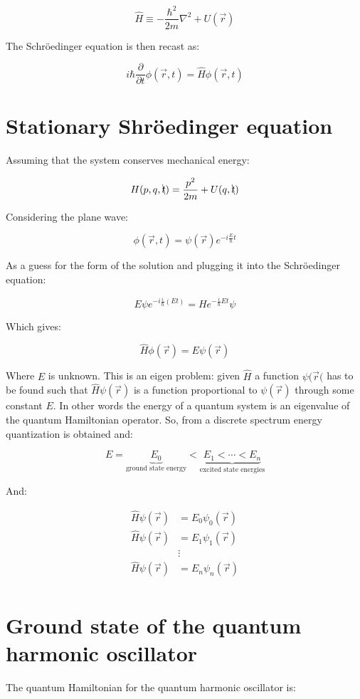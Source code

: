     $$\hat{H} \equiv -\frac{\hbar^2}{2m}\nabla^2+U(\vec{r})$$

    The Schr\"oedinger equation is then recast as:

    $$i\hbar \frac{\partial {}}{\partial {t}}\phi(\vec{r},t) = \hat{H} \phi(\vec{r},t)$$

\section{Stationary Shr\"oedinger equation}
Assuming that the system conserves mechanical energy:

$$H(p,q, \bcancel{t}) = \frac{p^2}{2m}+U(q,\bcancel{t})$$

Considering the plane wave:

$$\phi(\vec{r}, t) = \psi(\vec{r}) e^{-i \frac{E}{\hbar}t}$$

As a guess for the form of the solution and plugging it into the Schr\"oedinger equation:

$$E\psi e^{-i \frac{i}{\hbar}(Et)} = He^{-\frac{i}{\hbar}Et}\psi$$

Which gives:

$$\hat{H}\phi(\vec{r}) = E\psi(\vec{r})$$

Where $E$ is unknown.
This is an eigen problem: given $\hat{H}$ a function $\psi(\vec{r}($ has to be found such that $\hat{H}\psi(\vec{r})$ is a function proportional to $\psi(\vec{r})$ through some constant $E$.
In other words the energy of a quantum system is an eigenvalue of the quantum Hamiltonian operator.
So, from a discrete spectrum energy quantization is obtained and:

$$E = \underbrace{E_0}_{\text{ground state energy}} < \underbrace{E_1 < \cdots < E_n}_{\text{excited state energies}}$$

And:

\begin{align*}
  \hat{H}\psi(\vec{r}) &= E_0\psi_0(\vec{r})\\
  \hat{H}\psi(\vec{r}) &= E_1\psi_1(\vec{r})\\
                       &\vdots\\
  \hat{H}\psi(\vec{r}) &= E_n\psi_n(\vec{r})\\
\end{align*}

\section{Ground state of the quantum harmonic oscillator}
The quantum Hamiltonian for the quantum harmonic oscillator is:

